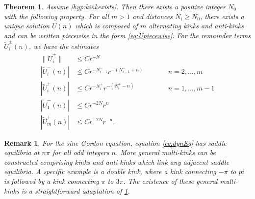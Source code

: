 \documentclass[12pt,reqno]{amsart}
\newtheorem{theorem}{Theorem}
\newtheorem{remark}{Remark}
\begin{document}
\begin{theorem}\label{th:KaKexists}
Assume \cref{hyp:kinkexists}. Then there exists a positive integer $N_0$ with the following property. For all $m > 1$ and distances $N_i \geq N_0$, there exists a unique solution $U(n)$ which is composed of $m$ alternating kinks and anti-kinks and can be written piecewise in the form \cref{eq:Upiecewise}. For the remainder terms $\tilde{U}_i^\pm(n)$, we have the estimates
\begin{equation}\label{eq:Uestimates}
\begin{aligned}
\|\tilde{U}_i^\pm\| &\leq C r^{-N} \\
| \tilde{U}_i^-(n) | &\leq C r^{-N_{i-1}^-} r^{-(N_{i-1}^- + n)} && \qquad n = 2, \dots, m\\
|\tilde{U}_i^+(n)| &\leq C r^{-N_i^+} r^{-(N_i^+ - n)} && \qquad n = 1, \dots, m-1 \\
| \tilde{U}_1^-(n) | &\leq C r^{-2N} r^{n} \\
|\tilde{U}_m^+(n)| &\leq C r^{-2N} r^{-n} .
\end{aligned}
\end{equation}
\end{theorem}

\begin{remark}\label{rem:SGmulitkinks}
For the sine-Gordon equation, equation \cref{eq:dynEq} has saddle equilibria at $n \pi$ for all odd integers $n$. More general multi-kinks can be constructed comprising kinks and anti-kinks which link any adjacent saddle equilibria. A specific example is a double kink, where a kink  connecting $-\pi$ to $pi$ is followed by a kink connecting $\pi$ to $3 \pi$. The existence of these general multi-kinks is a straightforward adaptation of \cref{th:KaKexists}.
\end{remark}
\end{document}
